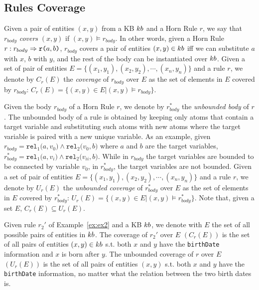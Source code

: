 \subsection{Rules Coverage}
Given a pair of entities $(x,y)$ from a KB ${\sc kb}$ and a Horn Rule $r$, we say that $r_{body}$ \emph{covers} $(x,y)$ if
$(x,y) \models r_{body}$. In other words, given a Horn Rule $r : r_{body} \Rightarrow \texttt{r(}a,b\texttt{)}$, $r_{body}$ covers a pair of entities $(x,y) \in {\sc kb}$ iff we can substitute $a$ with $x$, $b$ with $y$, and the rest of the body can be instantiated over ${\sc kb}$. Given a set of pair of entities $E = \{(x_1,y_1),(x_2,y_2),\cdots,(x_n,y_n)\}$ and a rule $r$, we denote by $C_r(E)$ the \emph{coverage} of $r_{body}$ over $E$ as the set of elements in $E$ covered by $r_{body}$: $C_r(E)=\{(x,y) \in E | (x,y) \models r_{body}\}$.

Given the body $r_{body}$ of a Horn Rule $r$, we denote by $r^{*}_{body}$ the \emph{unbounded body} of $r$. The unbounded body of a rule is obtained by keeping only atoms that contain a target variable and substituting such atoms with new atoms where the target variable is paired with a new unique variable. As an example, given $r_{body} = \texttt{rel}_1\texttt{(}a,v_0\texttt{)} \wedge \texttt{rel}_2\texttt{(}v_0,b\texttt{)}$ where $a$ and $b$ are the target variables, $r^{*}_{body} = \texttt{rel}_1\texttt{(}a,v_i\texttt{)} \wedge \texttt{rel}_2\texttt{(}v_{ii},b\texttt{)}$.
While in $r_{body}$ the target variables are bounded to be connected by variable $v_0$, in $r^{*}_{body}$, the target variables are not bounded.
Given a set of pair of entities $E = \{(x_1,y_1),(x_2,y_2),\cdots,(x_n,y_n)\}$ and a rule $r$, we denote by $U_r(E)$ the \emph{unbounded coverage} of $r^{*}_{body}$ over $E$ as the set of elements in $E$ covered by $r^{*}_{body}$: $U_r(E)=\{(x,y) \in E | (x,y) \models r^{*}_{body}\}$. Note that, given a set $E$, $C_r(E) \subseteq U_r(E)$. 

\begin{example}
	Given rule $r_2'$ of Example~\ref{ex:ex2} and a KB ${\sc kb}$, we denote with $E$ the set of all possible pairs of entities in ${\sc kb}$. The coverage of $r_2'$ over $E$ $(C_r(E))$ is the set of all pairs of entities $(x,y) \in {\sc kb}$ s.t. both $x$ and $y$ have the \texttt{birthDate} information and $x$ is born after $y$. The unbounded coverage of $r$ over $E$ $(U_r(E))$ is the set of all pairs of entities $(x,y)$ s.t. both $x$ and $y$ have the \texttt{birthDate} information, no matter what the relation between the two birth dates is. 
\end{example} 

